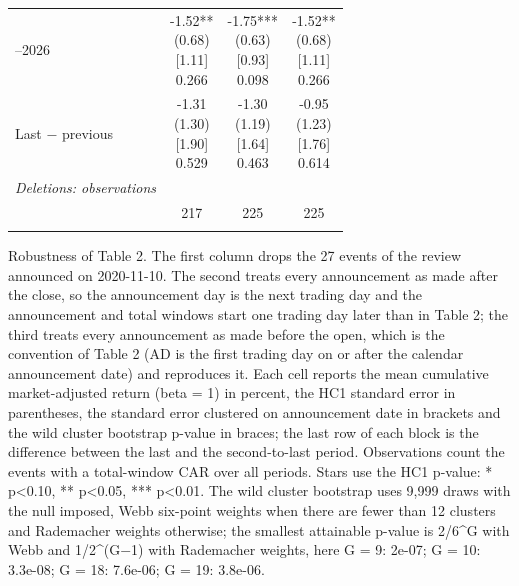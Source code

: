 \begin{threeparttable}
\begin{tabular}{@{}lccc}
\addlinespace[0.25ex]
\addlinespace[0.25ex]
2022–2026 & \makecell{-1.52**\\(0.68)\\{}[1.11]\\{0.266}} & \makecell{-1.75***\\(0.63)\\{}[0.93]\\{0.098}} & \makecell{-1.52**\\(0.68)\\{}[1.11]\\{0.266}} \\
\addlinespace[0.25ex]
\addlinespace[0.25ex]
Last $-$ previous & \makecell{-1.31\\(1.30)\\{}[1.90]\\{0.529}} & \makecell{-1.30\\(1.19)\\{}[1.64]\\{0.463}} & \makecell{-0.95\\(1.23)\\{}[1.76]\\{0.614}} \\
\addlinespace[0.25ex]
\midrule
\emph{Deletions: observations} \\
\addlinespace[0.25ex]
\addlinespace[1ex]
 & 217 & 225 & 225 \\
\addlinespace[0.25ex]
\bottomrule
\end{tabular}
\endgroup
\noindent\begin{minipage}{\linewidth}\smallskip\footnotesize
Robustness of Table 2. The first column drops the 27 events of the review announced on 2020-11-10. The second treats every announcement as made after the close, so the announcement day is the next trading day and the announcement and total windows start one trading day later than in Table 2; the third treats every announcement as made before the open, which is the convention of Table 2 (AD is the first trading day on or after the calendar announcement date) and reproduces it. Each cell reports the mean cumulative market-adjusted return (beta = 1) in percent, the HC1 standard error in parentheses, the standard error clustered on announcement date in brackets and the wild cluster bootstrap p-value in braces; the last row of each block is the difference between the last and the second-to-last period. Observations count the events with a total-window CAR over all periods. Stars use the HC1 p-value: * p<0.10, ** p<0.05, *** p<0.01. The wild cluster bootstrap uses 9,999 draws with the null imposed, Webb six-point weights when there are fewer than 12 clusters and Rademacher weights otherwise; the smallest attainable p-value is 2/6\textasciicircum{}G with Webb and 1/2\textasciicircum{}(G$-$1) with Rademacher weights, here G = 9: 2e-07; G = 10: 3.3e-08; G = 18: 7.6e-06; G = 19: 3.8e-06.\end{minipage}

\end{threeparttable}